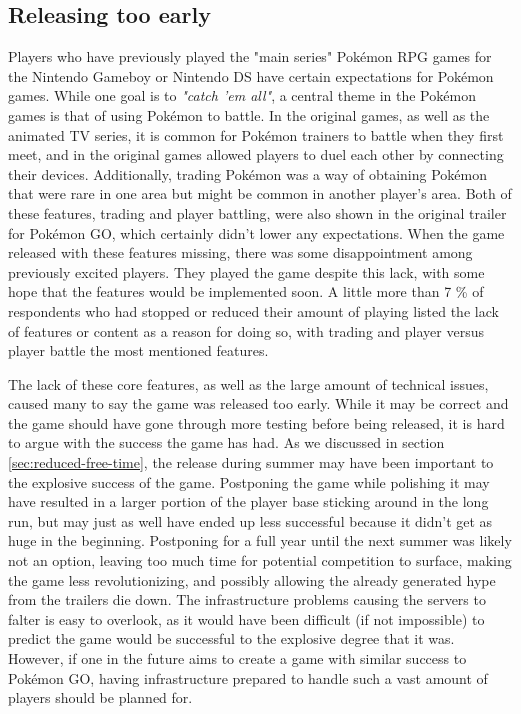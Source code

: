 
\subsection{Releasing too early}
Players who have previously played the "main series" Pokémon RPG games for the Nintendo Gameboy or Nintendo DS have certain expectations for Pokémon games. While one goal is to \emph{"catch 'em all"}, a central theme in the Pokémon games is that of using Pokémon to battle. In the original games, as well as the animated TV series, it is common for Pokémon trainers to battle when they first meet, and in the original games allowed players to duel each other by connecting their devices. Additionally, trading Pokémon was a way of obtaining Pokémon that were rare in one area but might be common in another player's area. Both of these features, trading and player battling, were also shown in the original trailer for Pokémon GO, which certainly didn't lower any expectations. When the game released with these features missing, there was some disappointment among previously excited players. They played the game despite this lack, with some hope that the features would be implemented soon. A little more than 7 \% of respondents who had stopped or reduced their amount of playing listed the lack of features or content as a reason for doing so, with trading and player versus player battle the most mentioned features.

The lack of these core features, as well as the large amount of technical issues, caused many to say the game was released too early. While it may be correct and the game should have gone through more testing before being released, it is hard to argue with the success the game has had. As we discussed in section \ref{sec:reduced-free-time}, the release during summer may have been important to the explosive success of the game. Postponing the game while polishing it may have resulted in a larger portion of the player base sticking around in the long run, but may just as well have ended up less successful because it didn't get as huge in the beginning.  Postponing for a full year until the next summer was likely not an option, leaving too much time for potential competition to surface, making the game less revolutionizing, and possibly allowing the already generated hype from the trailers die down. The infrastructure problems causing the servers to falter is easy to overlook, as it would have been difficult (if not impossible) to predict the game would be successful to the explosive degree that it was. However, if one in the future aims to create a game with similar success to Pokémon GO, having infrastructure prepared to handle such a vast amount of players should be planned for.

